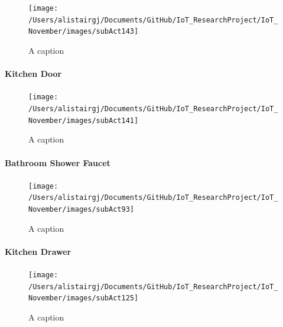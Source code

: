 \documentclass[11pt,]{article}
\let\oldparagraph\paragraph
\renewcommand{\paragraph}[1]{\oldparagraph{#1}\mbox{}}
\begin{document}
\begin{figure}[H]

{\centering \texttt{[image: /Users/alistairgj/Documents/GitHub/IoT\_ResearchProject/IoT\_November/images/subAct143]} 

}

\caption{A caption}\label{fig:subAct143}
\end{figure}

\hypertarget{kitchen-door}{%
\paragraph{Kitchen Door}\label{kitchen-door}}

\begin{figure}[H]

{\centering \texttt{[image: /Users/alistairgj/Documents/GitHub/IoT\_ResearchProject/IoT\_November/images/subAct141]} 

}

\caption{A caption}\label{fig:subAct141}
\end{figure}

\hypertarget{bathroom-shower-faucet}{%
\paragraph{Bathroom Shower Faucet}\label{bathroom-shower-faucet}}

\begin{figure}[H]

{\centering \texttt{[image: /Users/alistairgj/Documents/GitHub/IoT\_ResearchProject/IoT\_November/images/subAct93]} 

}

\caption{A caption}\label{fig:subAct93}
\end{figure}

\hypertarget{kitchen-drawer}{%
\paragraph{Kitchen Drawer}\label{kitchen-drawer}}

\begin{figure}[H]

{\centering \texttt{[image: /Users/alistairgj/Documents/GitHub/IoT\_ResearchProject/IoT\_November/images/subAct125]} 

}

\caption{A caption}\label{fig:subAct125}
\end{figure}
\end{document}
